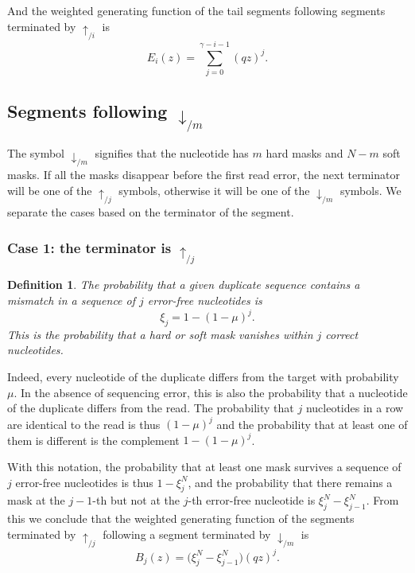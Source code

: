 \documentclass{article}
\newtheorem{definition}{Definition}
\begin{document}
And the weighted generating function of the tail segments following
segments terminated by $\uparrow_{/i}$ is
\begin{equation}
\label{eq:E}
E_i(z) = \sum_{j=0}^{\gamma-i-1} (qz)^j.
\end{equation}


\subsection{Segments following $\downarrow_{/m}$}

The symbol $\downarrow_{/m}$ signifies that the nucleotide has $m$ hard
masks and $N-m$ soft masks. If all the masks disappear before the first
read error, the next terminator will be one of the $\uparrow_{/j}$
symbols, otherwise it will be one of the $\downarrow_{/m}$ symbols. We
separate the cases based on the terminator of the segment.

\subsubsection*{Case 1: the terminator is $\uparrow_{/j}$}

\begin{definition}
The probability that a given duplicate sequence contains a mismatch in a
sequence of $j$ error-free nucleotides is
\begin{equation}
\label{eq:xi}
\xi_j = 1-(1-\mu)^j.
\end{equation}
This is the probability that a hard or soft mask vanishes within $j$
correct nucleotides.
\end{definition}

Indeed, every nucleotide of the duplicate differs from the target
with probability $\mu$. In the absence of sequencing error, this is also
the probability that a nucleotide of the duplicate differs from the read.
The probability that $j$ nucleotides in a row are identical to the read is
thus $(1-\mu)^j$ and the probability that at least one of them is
different is the complement $1-(1-\mu)^j$.

With this notation, the probability that at least one mask survives a
sequence of $j$ error-free nucleotides is thus $1-\xi_j^N$, and the
probability that there remains a mask at the $j-1$-th but not at the 
$j$-th error-free nucleotide is $\xi_j^N - \xi_{j-1}^N$. From this we
conclude that the weighted generating function of the segments terminated
by $\uparrow_{/j}$ following a segment terminated by $\downarrow_{/m}$ is
\begin{equation}
\label{eq:B}
B_j(z) = \Big( \xi_j^N-\xi_{j-1}^N \Big) (qz)^j.
\end{equation}
\end{document}
